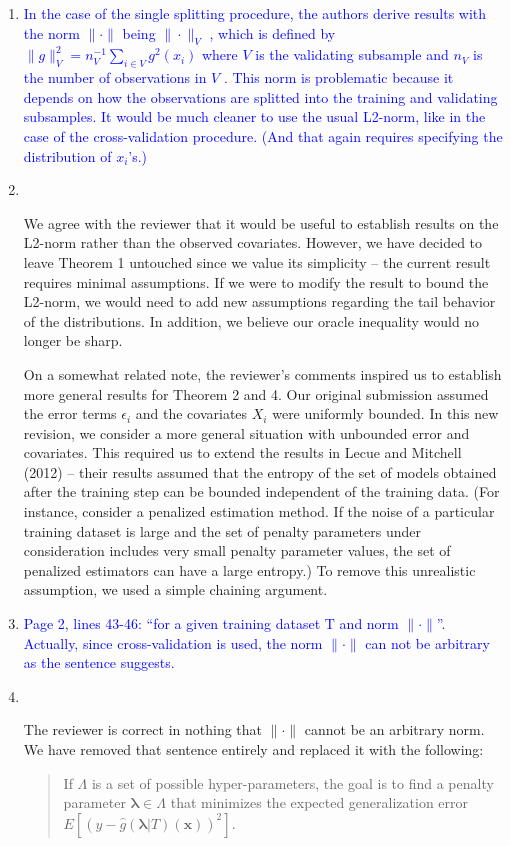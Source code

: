 \documentclass[]{article}
\newcommand{\point}[1]{\item \textcolor{blue}{#1}}
\newcommand{\reply}{\item[]\ }
\begin{document}
\begin{enumerate}
	
		\point{
			In the case of the single splitting procedure, the authors derive results with the norm $\|\cdot\|$ being $\|\cdot\|_V$ , which is defined by $\|g \|_V^2 = n_V^{-1} \sum_{i\in V} g^2(x_i)$ where $V$ is the validating subsample and $n_V$ is the number of observations in $V$ . This norm is problematic because it depends on how the observations are splitted into the training and validating subsamples. It would be much cleaner to use the usual L2-norm, like in the case of the cross-validation procedure. (And that again requires specifying the distribution of $x_i$’s.)
		}
	
		\reply{
			We agree with the reviewer that it would be useful to establish results on the L2-norm rather than the observed covariates.
			However, we have decided to leave Theorem 1 untouched since we value its simplicity -- the current result requires minimal assumptions.
			If we were to modify the result to bound the L2-norm, we would need to add new assumptions regarding the tail behavior of the distributions.
			In addition, we believe our oracle inequality would no longer be sharp.

			On a somewhat related note, the reviewer's comments inspired us to establish more general results for Theorem 2 and 4.
			Our original submission assumed the error terms $\epsilon_i$ and the covariates $X_i$ were uniformly bounded.
			In this new revision, we consider a more general situation with unbounded error and covariates.
			This required us to extend the results in Lecue and Mitchell (2012) -- their results assumed that the entropy of the set of models obtained after the training step can be bounded independent of the training data.
			(For instance, consider a penalized estimation method. If the noise of a particular training dataset is large and the set of penalty parameters under consideration includes very small penalty parameter values, the set of penalized estimators can have a large entropy.)
			To remove this unrealistic assumption, we used a simple chaining argument.
		}

		\point{
			Page 2, lines 43-46: “for a given training dataset T and norm $\|\cdot \|$”. Actually, since cross-validation is used, the norm $\|\cdot \|$ can not be arbitrary as the sentence suggests.
		}

		\reply{
			The reviewer is correct in nothing that $\|\cdot\|$ cannot be an arbitrary norm.
			We have removed that sentence entirely and replaced it with the following:
			\begin{quote}
			If $\Lambda$ is a set of possible hyper-parameters, the goal is to find a penalty parameter $\boldsymbol{\lambda} \in \Lambda$ that minimizes the expected generalization error
			$
			E \left [
			\left ( y - \hat{g}(\boldsymbol{\lambda} | T)(\boldsymbol{x}) \right )^2
			\right ].
			$
		\end{quote}
		
}
\end{enumerate}
\end{document}
